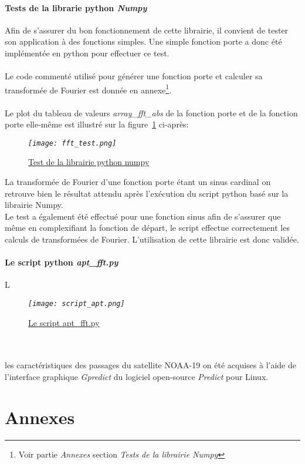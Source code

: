 \documentclass[12pt,fleqn]{book} %
\begin{document}
\subsection{Tests de la librarie python \emph{Numpy}}
Afin de s'assurer du bon fonctionnement de cette librairie, il convient de tester son application à des fonctions simples. Une simple fonction porte a donc été implémentée en python pour effectuer ce test.
~\\\\Le code commenté utilisé pour générer une fonction porte et calculer sa transformée de Fourier est donnée en annexe\footnote{Voir partie \emph{Annexes} section \emph{Tests de la librairie Numpy}}.
~\\\\Le plot du tableau de valeurs \emph{array\_fft\_abs} de la fonction porte et de la fonction porte elle-même est illustré sur la figure~\ref{fft_test} ci-après:
\begin{figure}[H]
	\centering
	\itshape
	\texttt{[image: fft\_test.png]}
	\caption{\label{fft_test} \underline{Test de la librairie python numpy}}
\end{figure}
La transformée de Fourier d'une fonction porte étant un sinus cardinal on retrouve bien le résultat attendu après l'exécution du script python basé sur la librairie Numpy.
~\\Le test a également été effectué pour une fonction sinus afin de s'assurer que même en complexifiant la fonction de départ, le script effectue correctement les calculs de transformées de Fourier. L'utilisation de cette librairie est donc validée.
\subsection{Le script python \emph{apt_fft.py}}
L
\begin{figure}[H]
	\centering
	\itshape
	\texttt{[image: script\_apt.png]}
	\caption{\label{script_apt} \underline{Le script apt\_fft.py}}
\end{figure}

~\\\\les caractéristiques des passages du satellite NOAA-19 on été acquises à l'aide de l'interface graphique \emph{Gpredict} du logiciel open-source \emph{Predict} pour Linux.





\setcounter{part}{-5}
\part{Annexes}
\end{document}
